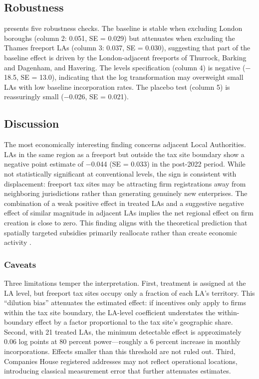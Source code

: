 \documentclass[12pt]{article}
\begin{document}
\subsection{Robustness}

 presents five robustness checks. The baseline is stable when excluding London boroughs (column 2: 0.051, SE = 0.029) but attenuates when excluding the Thames freeport LAs (column 3: 0.037, SE = 0.030), suggesting that part of the baseline effect is driven by the London-adjacent freeports of Thurrock, Barking and Dagenham, and Havering. The levels specification (column 4) is negative ($-$18.5, SE = 13.0), indicating that the log transformation may overweight small LAs with low baseline incorporation rates. The placebo test (column 5) is reassuringly small ($-$0.026, SE = 0.021).

\subsection{Discussion}

The most economically interesting finding concerns adjacent Local Authorities. LAs in the same region as a freeport but outside the tax site boundary show a negative point estimate of $-$0.044 (SE = 0.033) in the post-2022 period. While not statistically significant at conventional levels, the sign is consistent with displacement: freeport tax sites may be attracting firm registrations away from neighboring jurisdictions rather than generating genuinely new enterprises. The combination of a weak positive effect in treated LAs and a suggestive negative effect of similar magnitude in adjacent LAs implies the net regional effect on firm creation is close to zero. This finding aligns with the theoretical prediction that spatially targeted subsidies primarily reallocate rather than create economic activity \citep{kline2014people}.

\subsubsection*{Caveats} Three limitations temper the interpretation. First, treatment is assigned at the LA level, but freeport tax sites occupy only a fraction of each LA's territory. This ``dilution bias'' attenuates the estimated effect: if incentives only apply to firms within the tax site boundary, the LA-level coefficient understates the within-boundary effect by a factor proportional to the tax site's geographic share. Second, with 21 treated LAs, the minimum detectable effect is approximately 0.06 log points at 80 percent power---roughly a 6 percent increase in monthly incorporations. Effects smaller than this threshold are not ruled out. Third, Companies House registered addresses may not reflect operational locations, introducing classical measurement error that further attenuates estimates.
\end{document}
